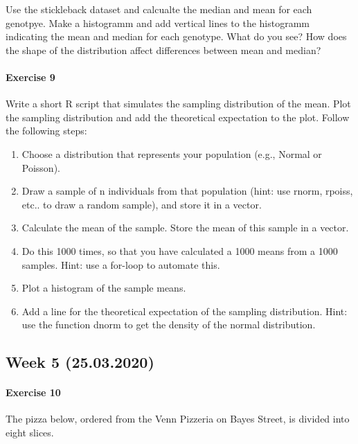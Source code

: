 \documentclass[]{article}
\providecommand{\tightlist}{%
  \setlength{\itemsep}{0pt}\setlength{\parskip}{0pt}}
\let\oldparagraph\paragraph
\renewcommand{\paragraph}[1]{\oldparagraph{#1}\mbox{}}
\begin{document}
Use the stickleback dataset and calcualte the median and mean for each
genotpye. Make a histogramm and add vertical lines to the histogramm
indicating the mean and median for each genotype. What do you see? How
does the shape of the distribution affect differences between mean and
median?

\hypertarget{exercise-9}{%
\paragraph{Exercise 9}\label{exercise-9}}

Write a short R script that simulates the sampling distribution of the
mean. Plot the sampling distribution and add the theoretical expectation
to the plot. Follow the following steps:

\begin{enumerate}
\def\labelenumi{\alph{enumi})}
\tightlist
\item
  Choose a distribution that represents your population (e.g., Normal or
  Poisson).
\item
  Draw a sample of n individuals from that population (hint: use rnorm,
  rpoiss, etc.. to draw a random sample), and store it in a vector.
\item
  Calculate the mean of the sample. Store the mean of this sample in a
  vector.
\item
  Do this 1000 times, so that you have calculated a 1000 means from a
  1000 samples. Hint: use a for-loop to automate this.
\item
  Plot a histogram of the sample means.
\item
  Add a line for the theoretical expectation of the sampling
  distribution. Hint: use the function dnorm to get the density of the
  normal distribution.
\end{enumerate}

\hypertarget{week-5-25.03.2020}{%
\subsection{Week 5 (25.03.2020)}\label{week-5-25.03.2020}}

\hypertarget{exercise-10}{%
\paragraph{Exercise 10}\label{exercise-10}}

The pizza below, ordered from the Venn Pizzeria on Bayes Street, is
divided into eight slices.
\end{document}
